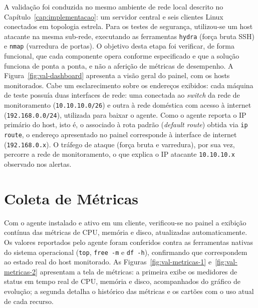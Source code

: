 \documentclass[
    12pt
    ,oneside
    ,a4paper
    ,chapter=TITLE
    ,section=TITLE
    ,sumario=abnt-6027-2012]{abntex2}
\begin{document}
A validação foi conduzida no mesmo ambiente de rede local descrito no Capítulo~\ref{cap:implementacao}: um servidor central e seis clientes Linux conectados em topologia estrela. Para os testes de segurança, utilizou-se um host atacante na mesma sub-rede, executando as ferramentas \texttt{hydra} (força bruta SSH) e \texttt{nmap} (varredura de portas). O objetivo desta etapa foi verificar, de forma funcional, que cada componente opera conforme especificado e que a solução funciona de ponta a ponta, e não a aferição de métricas de desempenho. A Figura~\ref{fig:val-dashboard} apresenta a visão geral do painel, com os hosts monitorados. Cabe um esclarecimento sobre os endereços exibidos: cada máquina de teste possuía duas interfaces de rede: uma conectada ao \textit{switch} da rede de monitoramento (\texttt{10.10.10.0/26}) e outra à rede doméstica com acesso à internet (\texttt{192.168.0.0/24}), utilizada para baixar o agente. Como o agente reporta o IP primário do host, isto é, o associado à rota padrão (\textit{default route}) obtida via \texttt{ip route}, o endereço apresentado no painel corresponde à interface de internet (\texttt{192.168.0.x}). O tráfego de ataque (força bruta e varredura), por sua vez, percorre a rede de monitoramento, o que explica o IP atacante \texttt{10.10.10.x} observado nos alertas.

\begin{figure}[H]
\end{figure}

\section{Coleta de Métricas}
\label{sec:valid-metricas}

Com o agente instalado e ativo em um cliente, verificou-se no painel a exibição contínua das métricas de CPU, memória e disco, atualizadas automaticamente. Os valores reportados pelo agente foram conferidos contra as ferramentas nativas do sistema operacional (\texttt{top}, \texttt{free -m} e \texttt{df -h}), confirmando que correspondem ao estado real do host monitorado. As Figuras~\ref{fig:val-metricas-1} e~\ref{fig:val-metricas-2} apresentam a tela de métricas: a primeira exibe os medidores de status em tempo real de CPU, memória e disco, acompanhados do gráfico de evolução; a segunda detalha o histórico das métricas e os cartões com o uso atual de cada recurso.
\end{document}
